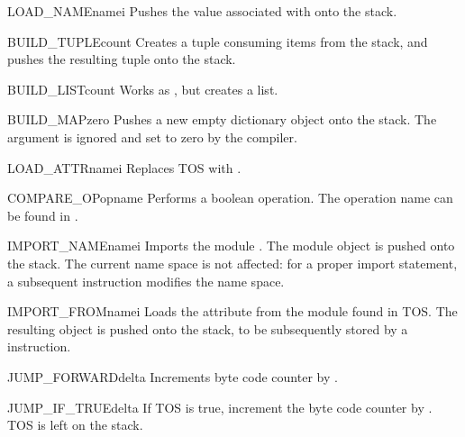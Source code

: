 \begin{opcodedesc}{LOAD_NAME}{namei}
Pushes the value associated with  onto the stack.
\end{opcodedesc}

\begin{opcodedesc}{BUILD_TUPLE}{count}
Creates a tuple consuming  items from the stack, and pushes
the resulting tuple onto the stack.
\end{opcodedesc}

\begin{opcodedesc}{BUILD_LIST}{count}
Works as , but creates a list.
\end{opcodedesc}

\begin{opcodedesc}{BUILD_MAP}{zero}
Pushes a new empty dictionary object onto the stack.  The argument is
ignored and set to zero by the compiler.
\end{opcodedesc}

\begin{opcodedesc}{LOAD_ATTR}{namei}
Replaces TOS with .
\end{opcodedesc}

\begin{opcodedesc}{COMPARE_OP}{opname}
Performs a boolean operation.  The operation name can be found
in .
\end{opcodedesc}

\begin{opcodedesc}{IMPORT_NAME}{namei}
Imports the module .  The module object is
pushed onto the stack.  The current name space is not affected: for a
proper import statement, a subsequent  instruction
modifies the name space.
\end{opcodedesc}

\begin{opcodedesc}{IMPORT_FROM}{namei}
Loads the attribute  from the module found in
TOS. The resulting object is pushed onto the stack, to be subsequently
stored by a  instruction.
\end{opcodedesc}

\begin{opcodedesc}{JUMP_FORWARD}{delta}
Increments byte code counter by .
\end{opcodedesc}

\begin{opcodedesc}{JUMP_IF_TRUE}{delta}
If TOS is true, increment the byte code counter by .  TOS is
left on the stack.
\end{opcodedesc}

